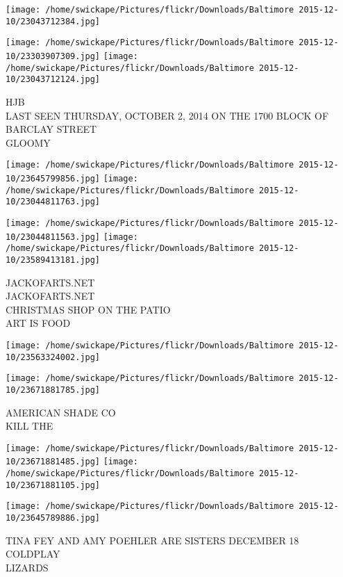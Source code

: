 \documentclass[10pt,letterpaper]{article}
\begin{document}
\texttt{[image: /home/swickape/Pictures/flickr/Downloads/Baltimore 2015-12-10/23043712384.jpg]}

\vspace{0.25in}
\texttt{[image: /home/swickape/Pictures/flickr/Downloads/Baltimore 2015-12-10/23303907309.jpg]}
\texttt{[image: /home/swickape/Pictures/flickr/Downloads/Baltimore 2015-12-10/23043712124.jpg]}

HJB\\
LAST SEEN THURSDAY, OCTOBER 2, 2014 ON THE 1700 BLOCK OF BARCLAY STREET\\
GLOOMY\\
\pagebreak

\texttt{[image: /home/swickape/Pictures/flickr/Downloads/Baltimore 2015-12-10/23645799856.jpg]}
\texttt{[image: /home/swickape/Pictures/flickr/Downloads/Baltimore 2015-12-10/23044811763.jpg]}

\texttt{[image: /home/swickape/Pictures/flickr/Downloads/Baltimore 2015-12-10/23044811563.jpg]}
\texttt{[image: /home/swickape/Pictures/flickr/Downloads/Baltimore 2015-12-10/23589413181.jpg]}

JACKOFARTS.NET\\
JACKOFARTS.NET\\
CHRISTMAS SHOP ON THE PATIO\\
ART IS FOOD\\
\pagebreak

\texttt{[image: /home/swickape/Pictures/flickr/Downloads/Baltimore 2015-12-10/23563324002.jpg]}

\vspace{0.25in}
\texttt{[image: /home/swickape/Pictures/flickr/Downloads/Baltimore 2015-12-10/23671881785.jpg]}

AMERICAN SHADE CO\\
KILL THE\\
\pagebreak

\texttt{[image: /home/swickape/Pictures/flickr/Downloads/Baltimore 2015-12-10/23671881485.jpg]}
\texttt{[image: /home/swickape/Pictures/flickr/Downloads/Baltimore 2015-12-10/23671881105.jpg]}

\vspace{0.25in}
\texttt{[image: /home/swickape/Pictures/flickr/Downloads/Baltimore 2015-12-10/23645789886.jpg]}

TINA FEY AND AMY POEHLER ARE SISTERS DECEMBER 18\\
COLDPLAY\\
LIZARDS\\
\pagebreak
\end{document}
